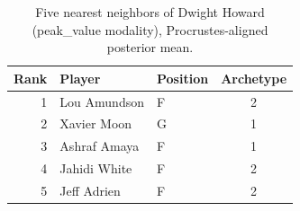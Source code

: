 \begin{table}[htbp]
  \centering\small
  \begin{tabular}{rllc}
    \toprule
    Rank & Player & Position & Archetype \\
    \midrule
    1 & Lou Amundson & F & 2 \\
    2 & Xavier Moon & G & 1 \\
    3 & Ashraf Amaya & F & 1 \\
    4 & Jahidi White & F & 2 \\
    5 & Jeff Adrien & F & 2 \\
    \bottomrule
  \end{tabular}
  \caption{Five nearest neighbors of Dwight Howard (peak_value modality), Procrustes-aligned posterior mean.}
  \label{tab:Dwight_Howard_neighbors_peak_value}
\end{table}

